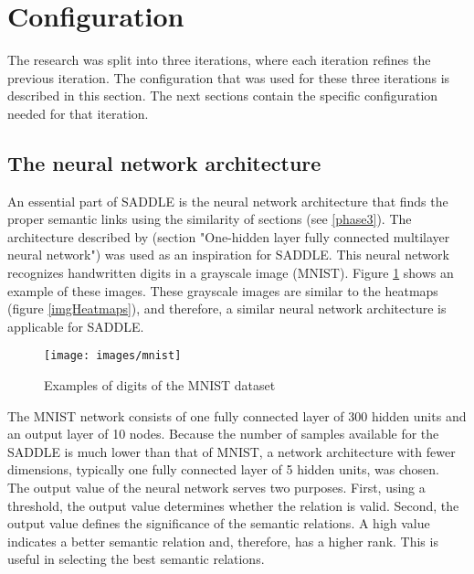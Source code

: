 \section{Configuration}
The research was split into three iterations, where each iteration refines the previous iteration. The configuration that was used for these three iterations is described in this section. The next sections contain the specific configuration needed for that iteration.
\subsection{The neural network architecture}
An essential part of SADDLE is the neural network architecture that finds the proper semantic links using the similarity of sections (see \ref{phase3}). The architecture described by \citet{lecun1998} (section "One-hidden layer fully connected multilayer neural network") was used as an inspiration for SADDLE. This neural network recognizes handwritten digits in a grayscale image (MNIST). Figure \ref{imgMNIST} shows an example of these images. These grayscale images are similar to the heatmaps (figure \ref{imgHeatmaps}), and therefore, a similar neural network architecture is applicable for SADDLE.\\

\begin{figure}[h]
\centering
\captionsetup{justification=centering}

\texttt{[image: images/mnist]}
\caption{Examples of digits of the MNIST dataset}
\label{imgMNIST}
\end{figure}

The MNIST network consists of one fully connected layer of 300 hidden units and an output layer of 10 nodes. Because the number of samples available for the SADDLE is much lower than that of MNIST, a network architecture with fewer dimensions, typically one fully connected layer of 5 hidden units, was chosen.\\

The output value of the neural network serves two purposes. First, using a threshold, the output value determines whether the relation is valid. Second, the output value defines the significance of the semantic relations. A high value indicates a better semantic relation and, therefore, has a higher rank. This is useful in selecting the best semantic relations.\\


